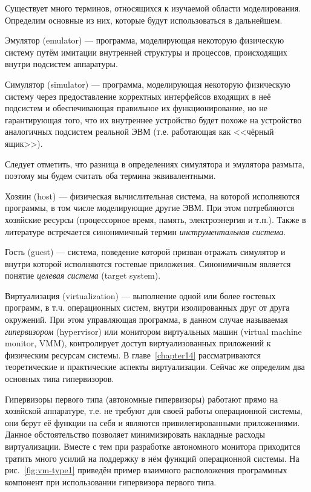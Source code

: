 Существует много терминов, относящихся к изучаемой области моделирования. Определим основные из них, которые будут использоваться в дальнейшем.

\begin{description*}

\item[Эмулятор] (\abbr emulator) --- программа, моделирующая некоторую физическую систему путём имитации внутренней структуры и процессов, происходящих внутри подсистем аппаратуры.

\item[Симулятор] (\abbr simulator) --- программа, моделирующая некоторую физическую систему через предоставление корректных интерфейсов входящих в неё подсистем и обеспечивающая правильное их функционирование, но не гарантирующая того, что их внутреннее устройство будет похоже на устройство аналогичных подсистем реальной ЭВМ (т.е. работающая как <<чёрный ящик>>). 

Следует отметить, что разница в определениях симулятора и эмулятора размыта, поэтому мы будем считать оба термина эквивалентными.

\item[Хозяин] (\abbr host) ---  физическая вычислительная система, на которой исполняются программы, в том числе моделирующие другие ЭВМ. При этом потребляются хозяйские ресурсы (процессорное время, память, электроэнергия и т.п.). Также в литературе встречается синонимичный термин \textit{инструментальная система}.

\item[Гость] (\abbr guest) ---  система, поведение которой призван отражать симулятор и внутри которой исполняются гостевые приложения. Синонимичным является понятие \textit{целевая система} (\abbr target system).

\item[Виртуализация] (\abbr virtualization) --- выполнение одной или более гостевых программ, в т.ч. операционных систем, внутри изолированных друг от друга окружений. При этом управляющая программа, в данном случае называемая \textit{гипервизором} (\abbr hypervisor) или монитором виртуальных машин (\abbr virtual machine monitor, VMM), контролирует доступ виртуализованных приложений к физическим ресурсам системы.  В главе~\ref{chapter14} рассматриваются теоретические и практические аспекты виртуализации. Сейчас же определим два основных типа гипервизоров.

\item[Гипервизоры первого типа] (автономные гипервизоры) работают прямо на хозяйской аппаратуре, т.е. не требуют для своей работы операционной системы, они берут её функции на себя и являются привилегированными приложениями. Данное обстоятельство позволяет минимизировать накладные расходы виртуализации. Вместе с тем при разработке автономного монитора приходится тратить много усилий на поддержку в нём функций операционной системы. На рис.~\ref{fig:vm-type1} приведён пример взаимного расположения программных компонент при использовании гипервизора первого типа.


\end{description*}
